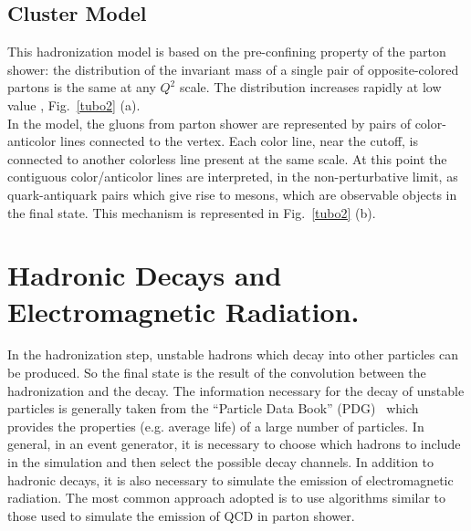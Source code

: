 \subsection*{Cluster Model}  This  hadronization model  is based on the pre-confining property of the parton shower: 
the distribution of the invariant mass of a single pair of opposite-colored partons is the same at any $ Q^2 $ scale. 
The distribution increases rapidly at low value , Fig.~\ref{tubo2} (a). \\
In the model, the gluons from parton shower are represented by pairs of color-anticolor lines connected to the vertex. Each color line, near the cutoff, is connected to another colorless line present at the same scale. At this point the contiguous color/anticolor lines are interpreted, in the non-perturbative limit, as quark-antiquark pairs which give rise to mesons, which are observable objects in the final state.
This mechanism is represented in Fig.~\ref{tubo2} (b).

\section{Hadronic Decays and  Electromagnetic   Radiation.}
In the hadronization step, unstable hadrons which decay into other particles can be produced. So the final state  is the result of the convolution between the  hadronization  and the decay. The information necessary for the decay of unstable particles  is generally taken from the  ``Particle Data Book'' (PDG)~\cite{bib:pdg} which provides the properties (e.g. average life) of a large number of particles.
In general, in an event generator, it is necessary to choose which hadrons to include in the simulation and then select the possible decay channels. In addition to hadronic decays, it is also necessary to simulate the emission of electromagnetic radiation. The most common approach adopted is to use algorithms similar to those used to simulate the emission of QCD in parton shower.

